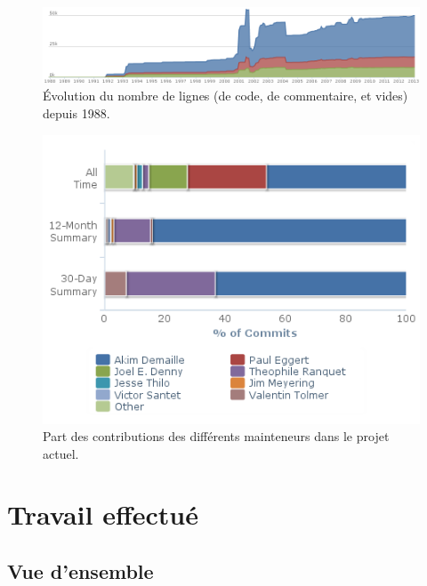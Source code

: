 \documentclass[a4paper,11pt,twoside,final]{article}
\begin{document}
  \begin{figure}[H]
    \begin{adjustwidth}{-2cm}{-2cm}
      \begin{center}
        \includegraphics[scale=0.55]{images/line-count}
        \caption{Évolution du nombre de lignes (de code, de commentaire, et
          vides) depuis 1988.}
      \end{center}
    \end{adjustwidth}
  \end{figure}

  \begin{figure}[H]
    \begin{adjustwidth}{-2cm}{-2cm}
      \begin{center}
        \includegraphics[scale=0.55]{images/contributors}
        \caption{Part des contributions des différents mainteneurs dans le
        projet actuel.}
      \end{center}
    \end{adjustwidth}
  \end{figure}
  \cleardoublepage

  \section{Travail effectué}

  \subsection{Vue d'ensemble}
\end{document}
